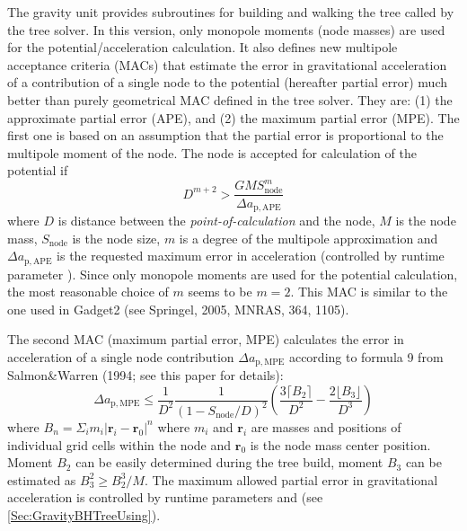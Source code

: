 The gravity unit provides subroutines for building and walking the tree called
by the tree solver. In this version, only monopole moments (node masses) are
used for the potential/acceleration calculation. It also defines new multipole
acceptance criteria (MACs) that estimate the error in gravitational acceleration
of a contribution of a single node to the potential (hereafter partial error)
much better than purely geometrical MAC defined in the tree solver. They are:
(1) the approximate partial error (APE), and (2) the maximum partial error
(MPE). The first one is based on an assumption that the partial error is
proportional to the multipole moment of the node. The node is accepted for
calculation of the potential if
\begin{equation}
D^{m+2} > \frac{GMS_\mathrm{node}^m}{\Delta a_\mathrm{p,APE}}
\end{equation}
where $D$ is distance between the {\em point-of-calculation} and the node, $M$
is the node mass, $S_\mathrm{node}$ is the node size, $m$ is a degree of the
multipole approximation and $\Delta a_\mathrm{p,APE}$ is the requested maximum error in
acceleration (controlled by runtime parameter ). Since only
monopole moments are used for the potential calculation, the most reasonable
choice of $m$ seems to be $m=2$. This MAC is similar to the one used in Gadget2
(see Springel, 2005, MNRAS, 364, 1105).

The second MAC (maximum partial error, MPE) calculates the error in acceleration
of a single node contribution $\Delta a_\mathrm{p,MPE}$ according to formula 9
from Salmon\&Warren (1994; see this paper for details):
\begin{equation}
\Delta a_\mathrm{p,MPE} \le \frac{1}{D^2}\frac{1}{(1-S_\mathrm{node}/D)^2}\left(
\frac{3\lceil B_2\rceil}{D^2} - \frac{2\lfloor B_3 \rfloor}{D^3}\right)
\end{equation}
where $B_n = \Sigma_i m_i |\mathbf{r}_i-\mathbf{r}_0|^n $ where $m_i$ and
$\mathbf{r}_i$ are masses and positions of individual grid cells within the node
and $\mathbf{r}_0$ is the node mass center position. Moment $B_2$ can be easily
determined during the tree build, moment $B_3$ can be estimated as $B_3^2 \ge
B_2^3/M$. The maximum allowed partial error in gravitational acceleration is
controlled by runtime parameters  and
 (see \ref{Sec:GravityBHTreeUsing}).

